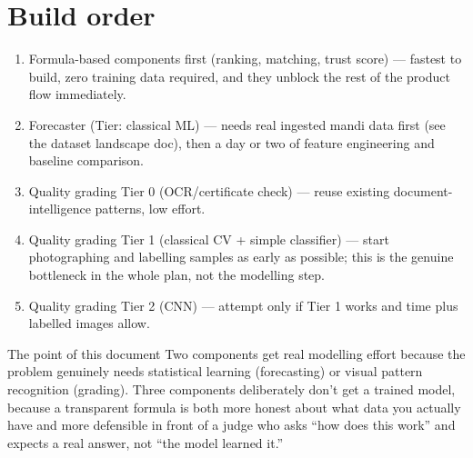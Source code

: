\documentclass[11pt]{article}
\begin{document}
\clearpage
\section{Build order}
\begin{enumerate}[leftmargin=1.6em]
\item Formula-based components first (ranking, matching, trust score) --- fastest to build, zero training
data required, and they unblock the rest of the product flow immediately.
\item Forecaster (Tier: classical ML) --- needs real ingested mandi data first (see the dataset landscape
doc), then a day or two of feature engineering and baseline comparison.
\item Quality grading Tier 0 (OCR/certificate check) --- reuse existing document-intelligence patterns,
low effort.
\item Quality grading Tier 1 (classical CV + simple classifier) --- start photographing and labelling
samples as early as possible; this is the genuine bottleneck in the whole plan, not the modelling step.
\item Quality grading Tier 2 (CNN) --- attempt only if Tier 1 works and time plus labelled images allow.
\end{enumerate}

\begin{warnbox}{The point of this document}
Two components get real modelling effort because the problem genuinely needs statistical learning
(forecasting) or visual pattern recognition (grading). Three components deliberately don't get a trained
model, because a transparent formula is both more honest about what data you actually have and more
defensible in front of a judge who asks ``how does this work'' and expects a real answer, not ``the model
learned it.''
\end{warnbox}
\end{document}
